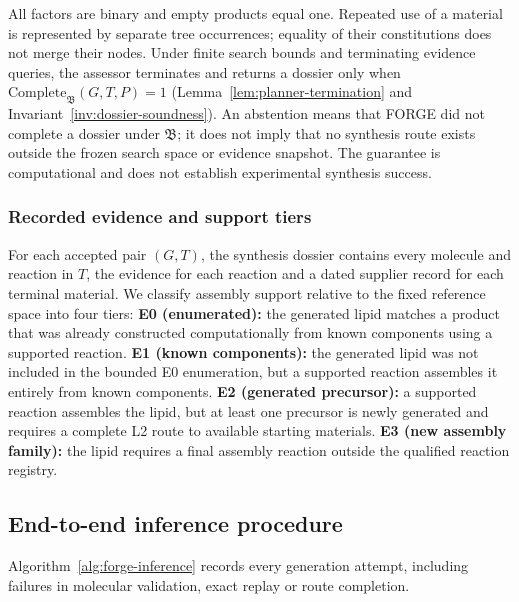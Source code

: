 \documentclass{article}
\theoremstyle{definition}
\begin{document}
All factors are binary and empty products equal one. Repeated use of a material is represented by
separate tree occurrences; equality of their constitutions does not merge their nodes.
Under finite search bounds and terminating evidence queries, the assessor terminates and returns a
dossier only when $\mathrm{Complete}_{\mathfrak B}(G,T,P)=1$
(Lemma~\ref{lem:planner-termination} and Invariant~\ref{inv:dossier-soundness}).
An abstention means that FORGE did not complete a dossier under $\mathfrak B$; it does not imply that
no synthesis route exists outside the frozen search space or evidence snapshot.
The guarantee is computational and does not establish experimental synthesis success.

\subsubsection{Recorded evidence and support tiers}

For each accepted pair $(G,T)$, the synthesis dossier contains every molecule and reaction in $T$,
the evidence for each reaction and a dated supplier record for each terminal material.
We classify assembly support relative to the fixed reference space into four tiers:
\textbf{E0 (enumerated):} the generated lipid matches a product that was already constructed
computationally from known components using a supported reaction.
\textbf{E1 (known components):} the generated lipid was not included in the bounded E0 enumeration,
but a supported reaction assembles it entirely from known components.
\textbf{E2 (generated precursor):} a supported reaction assembles the lipid, but at least one
precursor is newly generated and requires a complete L2 route to available starting materials.
\textbf{E3 (new assembly family):} the lipid requires a final assembly reaction outside the
qualified reaction registry.

\subsection{End-to-end inference procedure}
\label{app:inference}

Algorithm~\ref{alg:forge-inference} records every generation attempt, including failures in
molecular validation, exact replay or route completion.
\end{document}
